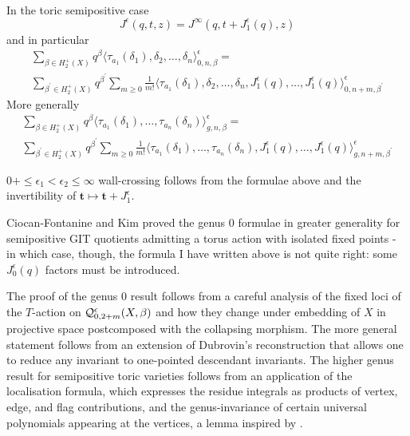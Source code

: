 \begin{thm}\label{thm:wcf}
 In the toric semipositive case \cite[Theorem 1.2.2]{CF-K-wallcrossing}
 \[ J^\epsilon(q,t,z)=J^\infty(q,t+J^\epsilon_1(q),z)\]
 and in particular
 \begin{multline*} \sum_{\beta\in H_2^+(X)}q^\beta\langle\tau_{a_1}(\delta_1),\delta_2,\ldots,\delta_n\rangle^\epsilon_{0,n,\beta}= \\ \sum_{\beta^\prime\in H_2^+(X)}q^{\beta^\prime}\sum_{m\geq 0}\frac{1}{m!}\langle\tau_{a_1}(\delta_1),\delta_2,\ldots,\delta_n,J^\epsilon_1(q),\ldots,J^\epsilon_1(q)\rangle^\epsilon_{0,n+m,\beta^\prime}\end{multline*}
 More generally \cite[Theorem 1.3.2]{CF-K-higher-genus}
 \begin{multline*} \sum_{\beta\in H_2^+(X)}q^\beta\langle\tau_{a_1}(\delta_1),\ldots,\tau_{a_n}(\delta_n)\rangle^\epsilon_{g,n,\beta}= \\ \sum_{\beta^\prime\in H_2^+(X)}q^{\beta^\prime}\sum_{m\geq 0}\frac{1}{m!}\langle\tau_{a_1}(\delta_1),\ldots,\tau_{a_n}(\delta_n),J^\epsilon_1(q),\ldots,J^\epsilon_1(q)\rangle^\epsilon_{g,n+m,\beta^\prime}\end{multline*}
\end{thm}
\begin{rmk} $0+\leq \epsilon_1<\epsilon_2\leq\infty$ wall-crossing follows from the formulae above and the invertibility of $\mathbf t\mapsto \mathbf t+J^\epsilon_1$.
\end{rmk}
Ciocan-Fontanine and Kim proved the genus $0$ formulae in greater generality for semipositive GIT quotients admitting a torus action with isolated fixed points - in which case, though, the formula I have written above is not quite right: some $J^\epsilon_0(q)$ factors must be introduced.
            
The proof of the genus $0$ result follows from a careful analysis of the fixed loci of the $T$-action on $\mathcal{Q}^{\epsilon}_{0,2+m}(X,\beta)$ and how they change under embedding of $X$ in projective space postcomposed with the collapsing morphism. The more general statement follows from an extension of Dubrovin's reconstruction that allows one to reduce any invariant to one-pointed descendant invariants. The higher genus result for semipositive toric varieties follows from an application of the localisation formula, which expresses the residue integrals as products of vertex, edge, and flag contributions, and the genus-invariance of certain universal polynomials appearing at the vertices, a lemma inspired by \cite[\S 7.6]{MOP}.
  
